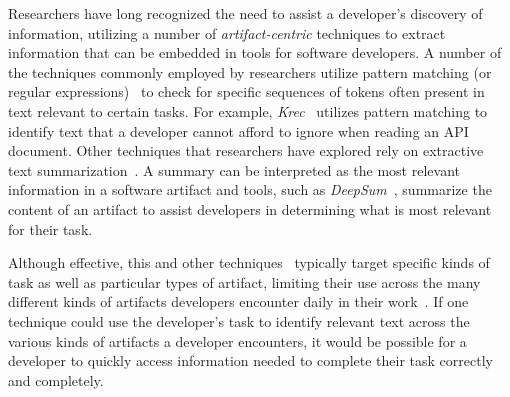 Researchers have long recognized the need to assist a developer's discovery of information,
utilizing a number of
\textit{artifact-centric} techniques
to extract
information that can be embedded in
tools for software developers. 
A number of the techniques commonly employed by researchers utilize pattern matching (or regular expressions)~\cite{Maalej2013, Bavota2014, Chaparro2017}   
to check for specific sequences of tokens often present in text relevant to certain tasks. For example, \textit{Krec}~\cite{Robillard2015} utilizes pattern matching to identify text that a developer cannot afford to ignore when reading an API document.
Other techniques that researchers have explored rely on extractive text summarization~\cite{Rastkar2010, Lotufo2012, Murray2008}. 
A summary can be interpreted as the most relevant information in a software artifact 
and tools, such as \textit{DeepSum}~\cite{Li2018}, summarize the content of an artifact 
to assist developers in determining what is most relevant for their task.






Although effective, this and other techniques~\cite{Lotufo2012, Ponzanelli2014, nadi2020} typically
target specific kinds of task as well as particular types of artifact, limiting their use across the
many different kinds of artifacts developers encounter
daily in their work~\cite{Meyer2017, meyer2019}.
If one technique could use the developer's task
to identify relevant text across the various kinds
of artifacts a developer encounters,
it would be possible for a
developer to quickly access information needed 
to complete their task correctly and completely.





